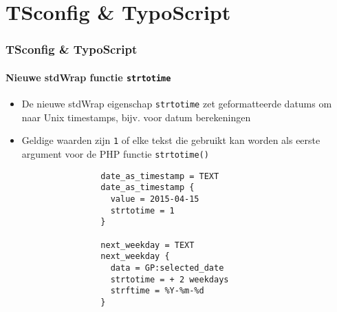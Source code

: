 %

\section{TSconfig \& TypoScript}

\begin{frame}[fragile]
	\frametitle{TSconfig \& TypoScript}
	\framesubtitle{Nieuwe stdWrap functie \texttt{strtotime}}

	\begin{itemize}

		\item De nieuwe stdWrap eigenschap \texttt{strtotime} zet geformatteerde datums om
			naar Unix timestamps, bijv. voor datum berekeningen

		\item Geldige waarden zijn \texttt{1} of elke tekst die gebruikt kan worden als eerste argument
			voor de PHP functie \texttt{strtotime()}

			\begin{lstlisting}
				date_as_timestamp = TEXT
				date_as_timestamp {
				  value = 2015-04-15
				  strtotime = 1
				}

				next_weekday = TEXT
				next_weekday {
				  data = GP:selected_date
				  strtotime = + 2 weekdays
				  strftime = %Y-%m-%d
				}
			\end{lstlisting}

	\end{itemize}

\end{frame}

